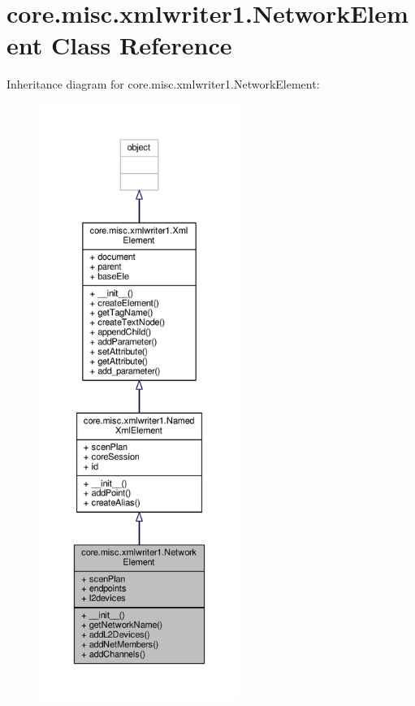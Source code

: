 \hypertarget{classcore_1_1misc_1_1xmlwriter1_1_1_network_element}{\section{core.\+misc.\+xmlwriter1.\+Network\+Element Class Reference}
\label{classcore_1_1misc_1_1xmlwriter1_1_1_network_element}
}


Inheritance diagram for core.\+misc.\+xmlwriter1.\+Network\+Element\+:
\nopagebreak
\begin{figure}[H]
\begin{center}
\leavevmode
\includegraphics[height=550pt]{classcore_1_1misc_1_1xmlwriter1_1_1_network_element__inherit__graph}
\end{center}
\end{figure}


